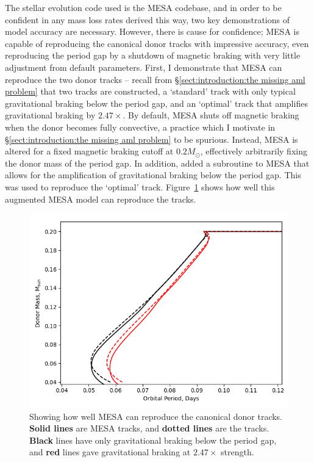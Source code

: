 The stellar evolution code used is the MESA codebase, and in order to be confident in any mass loss rates derived this way, two key demonstrations of model accuracy are necessary. However, there is cause for confidence; MESA is capable of reproducing the canonical \citep{knigge11} donor tracks with impressive accuracy, even reproducing the period gap by a shutdown of magnetic braking \citep{Paxton_2015} with very little adjustment from default parameters.
First, I demonstrate that MESA can reproduce the two \citet{knigge11} donor tracks -- recall from \S\ref{sect:introduction:the missing aml problem} that two tracks are constructed, a `standard' track with only typical gravitational braking below the period gap, and an `optimal' track that amplifies gravitational braking by $2.47\times$.
By default, MESA shuts off magnetic braking when the donor becomes fully convective, a practice which I motivate in \S\ref{sect:introduction:the missing aml problem} to be spurious. Instead, MESA is altered for a fixed magnetic braking cutoff at $0.2 M_\odot$, effectively arbitrarily fixing the donor mass of the period gap.
In addition, \citet{Pala2017a} added a subroutine to MESA that allows for the amplification of gravitational braking below the period gap. This was used to reproduce the `optimal' track. Figure~\ref{fig:modelling:MESA can reproduce the K11 tracks} shows how well this augmented MESA model can reproduce the \citet{knigge11} tracks.
\begin{figure}
    \centering
    \includegraphics[width=.9\textwidth]{figures/modelling/compare_K11_withspot_normb_and_1xrmb_fixedcutoff.png}
    \caption{Showing how well MESA can reproduce the canonical \citet{knigge11} donor tracks. {\bf Solid lines} are MESA tracks, and {\bf dotted lines} are the \citet{knigge11} tracks. {\bf Black} lines have only gravitational braking below the period gap, and {\bf red} lines gave gravitational braking at $2.47\times$ strength.}
    \label{fig:modelling:MESA can reproduce the K11 tracks}
\end{figure}

